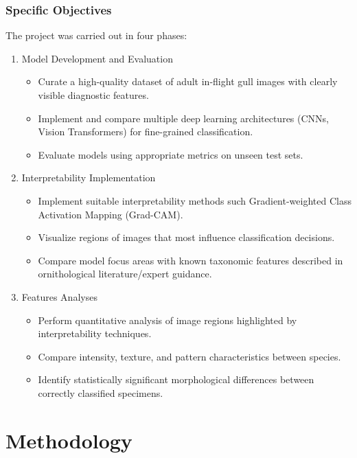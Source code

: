 \documentclass[a4paper,12pt]{report}
\begin{document}
\subsection*{Specific Objectives}
The project was carried out in four phases:
\begin{enumerate}
    \item Model Development and Evaluation
        \begin{itemize}
            \item Curate a high-quality dataset of adult in-flight gull images with clearly visible diagnostic features.
            \item Implement and compare multiple deep learning architectures (CNNs, Vision Transformers) for fine-grained classification.
            \item Evaluate models using appropriate metrics on unseen test sets.
        \end{itemize}
    \item Interpretability Implementation
        \begin{itemize}
            \item Implement suitable interpretability methods such Gradient-weighted Class Activation Mapping (Grad-CAM).
            \item Visualize regions of images that most influence classification decisions.
            \item Compare model focus areas with known taxonomic features described in ornithological literature/expert guidance.
        \end{itemize}
    \item Features Analyses
        \begin{itemize}
            \item Perform quantitative analysis of image regions highlighted by interpretability techniques.
            \item Compare intensity, texture, and pattern characteristics between species.
            \item Identify statistically significant morphological differences between correctly classified specimens.
        \end{itemize}
\end{enumerate}


\newpage
\chapter{Methodology}
\end{document}
